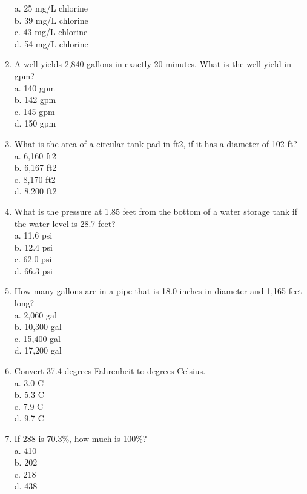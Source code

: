 \begin{enumerate}
a.	25 mg/L chlorine\\
b.	39 mg/L chlorine\\
c.	43 mg/L chlorine\\
d.	54 mg/L chlorine\\
\item A well yields 2,840 gallons in exactly 20 minutes. What is the well yield in gpm?\\
a.	140 gpm\\
b.	142 gpm\\
c.	145 gpm\\
d.	150 gpm\\
\item What is the area of a circular tank pad in ft2, if it has a diameter of 102 ft?\\
a.	6,160 ft2\\
b.	6,167 ft2\\
c.	8,170 ft2\\
d.	8,200 ft2\\
\item What is the pressure at 1.85 feet from the bottom of a water storage tank if the water level is 28.7 feet?\\
a.	11.6 psi\\
b.	12.4 psi\\
c.	62.0 psi\\
d.	66.3 psi\\
\item How many gallons are in a pipe that is 18.0 inches in diameter and 1,165 feet long?\\
a.	2,060 gal\\
b.	10,300 gal\\
c.	15,400 gal\\
d.	17,200 gal\\
\item Convert 37.4 degrees Fahrenheit to degrees Celsius.\\
a.	3.0 C\\
b.	5.3 C\\
c.	7.9 C\\
d.	9.7 C\\
\item If 288 is 70.3\%, how much is 100\%?\\
a.	410\\
b.	202\\
c.	218\\
d.	438\\



\end{enumerate}
